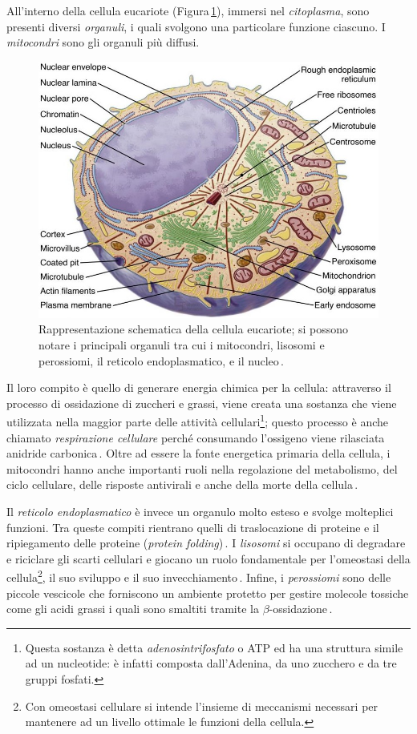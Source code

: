 All'interno della cellula eucariote (Figura\,\ref{fig:cell}), immersi nel \textsl{citoplasma}, sono presenti diversi \textsl{organuli}, i quali svolgono una particolare funzione ciascuno. I \textsl{mitocondri} sono gli organuli più diffusi.
% 
\begin{figure}[b!]
    \centering
    \includegraphics[width=.65\textwidth]{assets/cell.jpg}
    \caption[Rappresentazione schematica della cellula eucariote.]{Rappresentazione schematica della cellula eucariote; si possono notare i principali organuli tra cui i mitocondri, lisosomi e perossiomi, il reticolo endoplasmatico, e il nucleo\,\cite{pollard2022cell}.}\label{fig:cell}
\end{figure}
% 
Il loro compito è quello di generare energia chimica per la cellula: attraverso il processo di ossidazione di zuccheri e grassi, viene creata una sostanza che viene utilizzata nella maggior parte delle attività cellulari\footnote{Questa sostanza è detta \textsl{adenosintrifosfato} o ATP ed ha una struttura simile ad un nucleotide: è infatti composta dall'Adenina, da uno zucchero e da tre gruppi fosfati.}; questo processo è anche chiamato \textsl{respirazione cellulare} perché consumando l'ossigeno viene rilasciata anidride carbonica\,\cite{alberts2015essential, chinnery2003mitochondria}. Oltre ad essere la fonte energetica primaria della cellula, i mitocondri hanno anche importanti ruoli nella regolazione del metabolismo, del ciclo cellulare, delle risposte antivirali e anche della morte della cellula\,\cite{mcbride2006mitochondria}.

Il \textsl{reticolo endoplasmatico} è invece un organulo molto esteso e svolge molteplici funzioni. Tra queste compiti rientrano quelli di traslocazione di proteine e il ripiegamento delle proteine (\textsl{protein folding})\,\cite{alberts2015essential, voeltz2002structural}. I \textsl{lisosomi} si occupano di degradare e riciclare gli scarti cellulari e giocano un ruolo fondamentale per l'omeostasi della cellula\footnote{Con omeostasi cellulare si intende l'insieme di meccanismi necessari per mantenere ad un livello ottimale le funzioni della cellula.}, il suo sviluppo e il suo invecchiamento\,\cite{ballabio2016awesome, yang2021lysosome, dell2000lysosome}. Infine, i \textsl{perossiomi} sono delle piccole vescicole che forniscono un ambiente protetto per gestire molecole tossiche come gli acidi grassi i quali sono smaltiti tramite la $\beta$-ossidazione\,\cite{alberts2015essential, islinger2012peroxisome, islinger2018peroxisome}.

